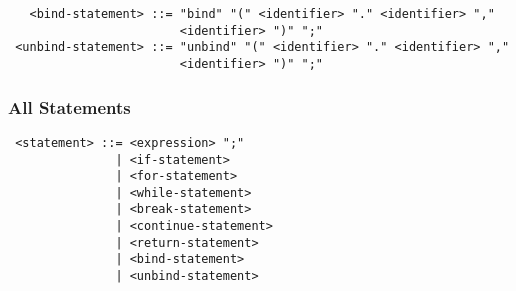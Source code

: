 \begin{verbatim}
   <bind-statement> ::= "bind" "(" <identifier> "." <identifier> ","
                        <identifier> ")" ";"
 <unbind-statement> ::= "unbind" "(" <identifier> "." <identifier> ","
                        <identifier> ")" ";"
\end{verbatim}

\subsubsection{All Statements}

\begin{verbatim}
 <statement> ::= <expression> ";"
               | <if-statement>
               | <for-statement>
               | <while-statement>
               | <break-statement>
               | <continue-statement>
               | <return-statement>
               | <bind-statement>
               | <unbind-statement>
\end{verbatim}


